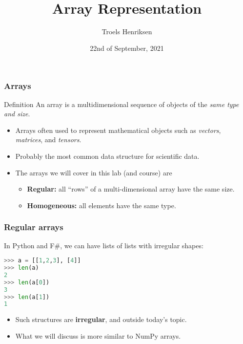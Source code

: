 \documentclass[rgb,dvipsnames,aspectratio=169,xcolor=table]{beamer}
\title{Array Representation}
\author{Troels Henriksen}
\date{22nd of September, 2021}
\begin{document}
\frame{\titlepage}

\begin{frame}
  \frametitle{Arrays}

  \begin{block}{Definition}
    An array is a multidimensional sequence of objects of the
    \textit{same type and size}.
  \end{block}

  \begin{itemize}
  \item Arrays often used to represent mathematical objects such as
    \textit{vectors}, \textit{matrices}, and \textit{tensors}.
  \item Probably the most common data structure for scientific data.
  \item The arrays we will cover in this lab (and course) are
    \begin{itemize}
    \item \textbf{Regular:} all ``rows'' of a multi-dimensional array
      have the same size.
    \item \textbf{Homogeneous:} all elements have the same type.
    \end{itemize}
  \end{itemize}
\end{frame}

\begin{frame}[fragile]
  \frametitle{Regular arrays}

  In Python and F\#, we can have lists of lists with irregular shapes:

\begin{lstlisting}[language=Python]
>>> a = [[1,2,3], [4]]
>>> len(a)
2
>>> len(a[0])
3
>>> len(a[1])
1
\end{lstlisting}

  \begin{itemize}
  \item Such structures are \textbf{irregular}, and outside today's
    topic.
  \item What we will discuss is more similar to NumPy arrays.
  \end{itemize}

\end{frame}
\end{document}
